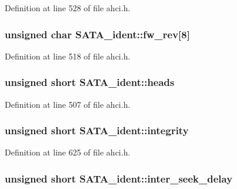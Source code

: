 Definition at line 528 of file ahci.\+h.

\subsubsection[{\texorpdfstring{fw\+\_\+rev}{fw_rev}}]{\setlength{\rightskip}{0pt plus 5cm}unsigned char S\+A\+T\+A\+\_\+ident\+::fw\+\_\+rev\mbox{[}8\mbox{]}}\hypertarget{structSATA__ident_a083cc6c6f2a7728709aff9726f8c6913}{}\label{structSATA__ident_a083cc6c6f2a7728709aff9726f8c6913}


Definition at line 518 of file ahci.\+h.

\subsubsection[{\texorpdfstring{heads}{heads}}]{\setlength{\rightskip}{0pt plus 5cm}unsigned short S\+A\+T\+A\+\_\+ident\+::heads}\hypertarget{structSATA__ident_a3e5cda071ccaf6040395b709b17af752}{}\label{structSATA__ident_a3e5cda071ccaf6040395b709b17af752}


Definition at line 507 of file ahci.\+h.

\subsubsection[{\texorpdfstring{integrity}{integrity}}]{\setlength{\rightskip}{0pt plus 5cm}unsigned short S\+A\+T\+A\+\_\+ident\+::integrity}\hypertarget{structSATA__ident_a9bbddec56882e46f0385cea68e3d9f4c}{}\label{structSATA__ident_a9bbddec56882e46f0385cea68e3d9f4c}


Definition at line 625 of file ahci.\+h.

\subsubsection[{\texorpdfstring{inter\+\_\+seek\+\_\+delay}{inter_seek_delay}}]{\setlength{\rightskip}{0pt plus 5cm}unsigned short S\+A\+T\+A\+\_\+ident\+::inter\+\_\+seek\+\_\+delay}\hypertarget{structSATA__ident_a6d2b3ab59e6b5a3914cfc775ac7a273b}{}\label{structSATA__ident_a6d2b3ab59e6b5a3914cfc775ac7a273b}


